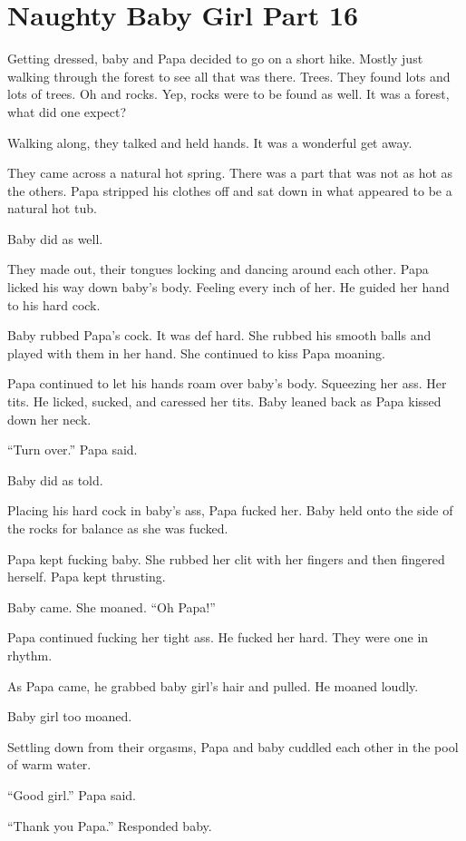 \section{Naughty Baby Girl Part 16}

     Getting dressed, baby and Papa decided to go on a short hike. Mostly just walking through the forest to see all that was there. Trees. They found lots and lots of trees. Oh and rocks. Yep, rocks were to be found as well. It was a forest, what did one expect?

     Walking along, they talked and held hands. It was a wonderful get away.

     They came across a natural hot spring. There was a part that was not as hot as the others. Papa stripped his clothes off and sat down in what appeared to be a natural hot tub.

     Baby did as well.

     They made out, their tongues locking and dancing around each other. Papa licked his way down baby’s body. Feeling every inch of her. He guided her hand to his hard cock.

     Baby rubbed Papa’s cock. It was def hard. She rubbed his smooth balls and played with them in her hand. She continued to kiss Papa moaning.

     Papa continued to let his hands roam over baby’s body. Squeezing her ass. Her tits. He licked, sucked, and caressed her tits. Baby leaned back as Papa kissed down her neck.

     “Turn over.” Papa said.

     Baby did as told.

     Placing his hard cock in baby’s ass, Papa fucked her. Baby held onto the side of the rocks for balance as she was fucked.

     Papa kept fucking baby. She rubbed her clit with her fingers and then fingered herself. Papa kept thrusting.

     Baby came. She moaned. “Oh Papa!”

     Papa continued fucking her tight ass. He fucked her hard. They were one in rhythm.

     As Papa came, he grabbed baby girl’s hair and pulled. He moaned loudly.

     Baby girl too moaned.

     Settling down from their orgasms, Papa and baby cuddled each other in the pool of warm water.

     “Good girl.” Papa said.

     “Thank you Papa.” Responded baby.


